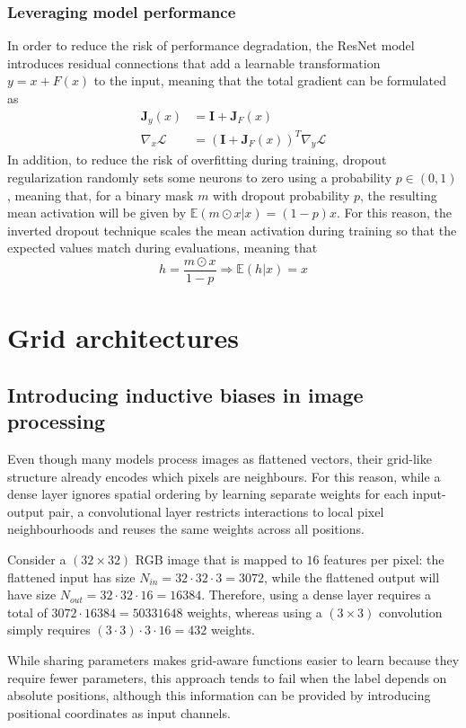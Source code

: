 \documentclass{report}
\begin{document}
\subsection{Leveraging model performance}
In order to reduce the risk of performance degradation, the ResNet model introduces residual connections that add a learnable transformation $\displaystyle y = x + F(x)$ to the input, meaning that the total gradient can be formulated as
\begin{align*}
    \mathbf{J}_y(x) &= \mathbf{I} + \mathbf{J}_F(x) \\
    \nabla_x\mathcal{L} &= (\mathbf{I} + \mathbf{J}_F(x))^T\nabla_y\mathcal{L}
\end{align*}
In addition, to reduce the risk of overfitting during training, dropout regularization randomly sets some neurons to zero using a probability $\displaystyle p \in (0, 1)$, meaning that, for a binary mask $\displaystyle m$ with dropout probability $\displaystyle p$, the resulting mean activation will be given by $\displaystyle \mathbb{E}(m \odot x|x) = (1 - p)x$. \newline
For this reason, the inverted dropout technique scales the mean activation during training so that the expected values match during evaluations, meaning that
\[h = \frac{m \odot x}{1 - p} \Rightarrow \mathbb{E}(h|x) = x\]

\chapter{Grid architectures}
\section{Introducing inductive biases in image processing}
Even though many models process images as flattened vectors, their grid-like structure already encodes which pixels are neighbours. \newline
For this reason, while a dense layer ignores spatial ordering by learning separate weights for each input-output pair, a convolutional layer restricts interactions to local pixel neighbourhoods and reuses the same weights across all positions.
\begin{examplebox}
    Consider a $\displaystyle (32 \times 32)$ RGB image that is mapped to $\displaystyle 16$ features per pixel: the flattened input has size $\displaystyle N_{in} = 32 \cdot 32 \cdot 3 = 3072$, while the flattened output will have size $\displaystyle N_{out} = 32 \cdot 32 \cdot 16 = 16384$. \newline
    Therefore, using a dense layer requires a total of $\displaystyle 3072 \cdot 16384 = 50331648$ weights, whereas using a $\displaystyle (3 \times 3)$ convolution simply requires $\displaystyle (3 \cdot 3) \cdot 3 \cdot 16 = 432$ weights.
\end{examplebox}
\noindent While sharing parameters makes grid-aware functions easier to learn because they require fewer parameters, this approach tends to fail when the label depends on absolute positions, although this information can be provided by introducing positional coordinates as input channels.
\end{document}
